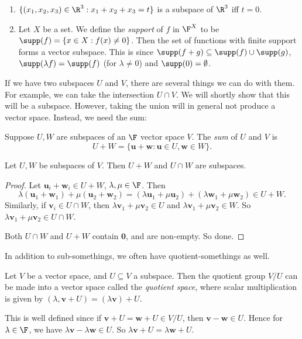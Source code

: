 \documentclass[a4paper]{article}
\begin{document}
\begin{eg}\leavevmode
  \begin{enumerate}
    \item $\{(x_1, x_2, x_3) \in \R^3: x_1 + x_2 + x_3 = t\}$ is a subspace of $\R^3$ iff $t = 0$.
    \item Let $X$ be a set. We define the \emph{support} of $f$ in $\F^X$ to be $\supp(f) = \{x\in X: f(x) \not= 0\}$. Then the set of functions with finite support forms a vector subspace. This is since $\supp (f + g) \subseteq \supp(f) \cup \supp(g)$, $\supp (\lambda f) = \supp (f)$ (for $\lambda \not= 0$) and $\supp (0) = \emptyset$.
  \end{enumerate}
\end{eg}

If we have two subspaces $U$ and $V$, there are several things we can do with them. For example, we can take the intersection $U\cap V$. We will shortly show that this will be a subspace. However, taking the union will in general not produce a vector space. Instead, we need the sum:

\begin{defi}
  Suppose $U, W$ are subspaces of an $\F$ vector space $V$. The \emph{sum} of $U$ and $V$ is
  \[
    U + W = \{\mathbf{u} + \mathbf{w}: \mathbf{u}\in U, \mathbf{w}\in W\}.
  \]
\end{defi}

\begin{prop}
  Let $U, W$ be subspaces of $V$. Then $U + W$ and $U\cap W$ are subspaces.
\end{prop}

\begin{proof}
  Let $\mathbf{u}_i + \mathbf{w}_i \in U + W$, $\lambda, \mu\in \F$. Then
  \[
    \lambda(\mathbf{u}_1 + \mathbf{w}_1) + \mu(\mathbf{u}_2 + \mathbf{w}_2) = (\lambda\mathbf{u}_1 + \mu\mathbf{u}_2) + (\lambda\mathbf{w}_1 + \mu\mathbf{w}_2) \in U + W.
  \]
  Similarly, if $\mathbf{v}_i \in U\cap W$, then $\lambda \mathbf{v}_1 + \mu \mathbf{v}_2\in U$ and $\lambda \mathbf{v}_1 + \mu \mathbf{v}_2\in W$. So $\lambda \mathbf{v}_1 + \mu \mathbf{v}_2\in U\cap W$.

  Both $U\cap W$ and $U + W$ contain $\mathbf{0}$, and are non-empty. So done.
\end{proof}

In addition to sub-somethings, we often have quotient-somethings as well.
\begin{defi}
  Let $V$ be a vector space, and $U\subseteq V$ a subspace. Then the quotient group $V/U$ can be made into a vector space called the \emph{quotient space}, where scalar multiplication is given by $(\lambda, \mathbf{v} + U) = (\lambda \mathbf{v}) + U$.

  This is well defined since if $\mathbf{v} + U = \mathbf{w} + U\in V/U$, then $\mathbf{v} - \mathbf{w} \in U$. Hence for $\lambda \in \F$, we have $\lambda \mathbf{v} - \lambda \mathbf{w} \in U$. So $\lambda \mathbf{v} + U = \lambda \mathbf{w} + U$.
\end{defi}
\end{document}
